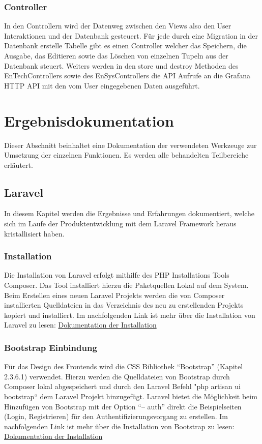 \subsection{Controller}
In den Controllern wird der Datenweg zwischen den Views also den User Interaktionen und der Datenbank gesteuert. Für jede durch eine Migration in der Datenbank erstelle Tabelle gibt es einen Controller welcher das Speichern, die Ausgabe, das Editieren sowie das Löschen von einzelnen Tupeln aus der Datenbank steuert. Weiters werden in den store und destroy Methoden des EnTechControllers sowie des EnSysControllers die API Aufrufe an die Grafana HTTP API mit den vom User eingegebenen Daten ausgeführt.

\chapter{Ergebnisdokumentation }
Dieser Abschnitt beinhaltet eine Dokumentation der verwendeten Werkzeuge zur Umsetzung der einzelnen Funktionen. Es werden alle behandelten Teilbereiche erläutert.

\section{Laravel }
In diesem Kapitel werden die Ergebnisse und Erfahrungen dokumentiert, welche sich im Laufe der Produktentwicklung mit dem Laravel Framework heraus kristallisiert haben.

\subsection{Installation}
Die Installation von Laravel erfolgt mithilfe des PHP Installations Tools Composer. Das Tool installiert hierzu die Paketquellen Lokal auf dem System. Beim Erstellen eines neuen Laravel Projekts werden die von Composer installierten Quelldateien in das Verzeichnis des neu zu erstellenden Projekts kopiert und installiert. Im nachfolgenden Link ist mehr über die Installation von Laravel zu lesen:
\href{https://laravel.com/docs/9.x#installation-via-composer}{Dokumentation der Installation}


\subsection{Bootstrap Einbindung}
Für das Design des Frontends wird die CSS Bibliothek “Bootstrap” (Kapitel 2.3.6.1) verwendet. Hierzu werden die Quelldateien von Bootstrap durch Composer lokal abgespeichert und durch den Laravel Befehl "php artisan ui bootstrap“ dem Laravel Projekt hinzugefügt. Laravel bietet die Möglichkeit beim Hinzufügen von Bootstrap mit der Option “-- auth” direkt die Beispielseiten (Login, Registrieren) für den Authentifizierungsvorgang zu erstellen. Im nachfolgenden Link ist mehr über die Installation von Bootstrap zu lesen:
\href{https://www.positronx.io/how-to-properly-install-and-use-bootstrap-in-laravel/}{Dokumentation der Installation}


